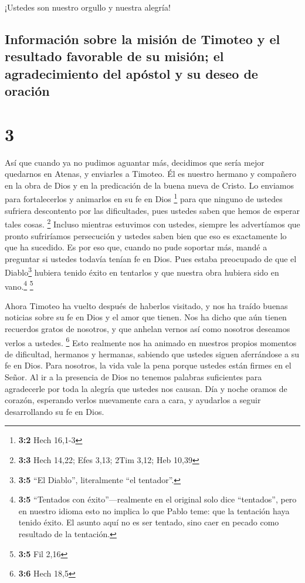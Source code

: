  ¡Ustedes son nuestro orgullo y nuestra alegría!

\hypertarget{informaciuxf3n-sobre-la-misiuxf3n-de-timoteo-y-el-resultado-favorable-de-su-misiuxf3n-el-agradecimiento-del-apuxf3stol-y-su-deseo-de-oraciuxf3n}{%
\subsection{Información sobre la misión de Timoteo y el resultado
favorable de su misión; el agradecimiento del apóstol y su deseo de
oración}\label{informaciuxf3n-sobre-la-misiuxf3n-de-timoteo-y-el-resultado-favorable-de-su-misiuxf3n-el-agradecimiento-del-apuxf3stol-y-su-deseo-de-oraciuxf3n}}

\hypertarget{section-2}{%
\section{3}\label{section-2}}

 Así que cuando ya no pudimos aguantar más, decidimos que
sería mejor quedarnos en Atenas,  y enviarles a Timoteo.
Él es nuestro hermano y compañero en la obra de Dios y en la predicación
de la buena nueva de Cristo. Lo enviamos para fortalecerlos y animarlos
en su fe en Dios \footnote{\textbf{3:2} Hech 16,1-3}  para
que ninguno de ustedes sufriera descontento por las dificultades, pues
ustedes saben que hemos de esperar tales cosas. \footnote{\textbf{3:3}
  Hech 14,22; Efes 3,13; 2Tim 3,12; Heb 10,39}  Incluso
mientras estuvimos con ustedes, siempre les advertíamos que pronto
sufriríamos persecución y ustedes saben bien que eso es exactamente lo
que ha sucedido.  Es por eso que, cuando no pude soportar
más, mandé a preguntar si ustedes todavía tenían fe en Dios. Pues estaba
preocupado de que el Diablo\footnote{\textbf{3:5} ``El Diablo'',
  literalmente ``el tentador''.} hubiera tenido éxito en tentarlos y que
nuestra obra hubiera sido en vano.\footnote{\textbf{3:5} ``Tentados con
  éxito''---realmente en el original solo dice ``tentados'', pero en
  nuestro idioma esto no implica lo que Pablo teme: que la tentación
  haya tenido éxito. El asunto aquí no es ser tentado, sino caer en
  pecado como resultado de la tentación.} \footnote{\textbf{3:5} Fil
  2,16}

 Ahora Timoteo ha vuelto después de haberlos visitado, y
nos ha traído buenas noticias sobre su fe en Dios y el amor que tienen.
Nos ha dicho que aún tienen recuerdos gratos de nosotros, y que anhelan
vernos así como nosotros deseamos verlos a ustedes. \footnote{\textbf{3:6}
  Hech 18,5}  Esto realmente nos ha animado en nuestros
propios momentos de dificultad, hermanos y hermanas, sabiendo que
ustedes siguen aferrándose a su fe en Dios.  Para
nosotros, la vida vale la pena porque ustedes están firmes en el Señor.
 Al ir a la presencia de Dios no tenemos palabras
suficientes para agradecerle por toda la alegría que ustedes nos causan.
 Día y noche oramos de corazón, esperando verlos
nuevamente cara a cara, y ayudarlos a seguir desarrollando su fe en
Dios.

